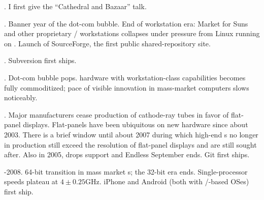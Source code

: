 .
I first give the ``Cathedral and Bazaar'' talk.

.
Banner year of the dot-com bubble. End of workstation era: Market for Suns and
other proprietary \UNIX/ workstations collapses under pressure from Linux running
on . Launch of SourceForge, the first public shared-repository site.

.
Subversion first ships.

.
Dot-com bubble pops.  hardware with workstation-class capabilities becomes
fully commoditized; pace of visible innovation in mass-market computers slows
noticeably.

.
Major manufacturers cease production of cathode-ray tubes in favor of
flat-panel displays. Flat-panels have been ubiquitous on new hardware since
about 2003. There is a brief window until about 2007 during which high-end s
no longer in production still exceed the resolution of flat-panel displays and
are still sought after. Also in 2005,  drops  support and Endless
September ends. Git first ships.

-2008.
64-bit transition in mass market s; the 32-bit era ends. Single-processor
speeds plateau at $4 \pm 0.25$GHz. iPhone and Android (both with \UNIX/-based OSes)
first ship.

\bye
